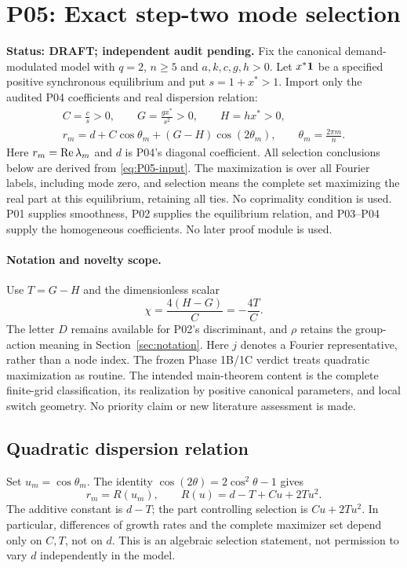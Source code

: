 \section{P05: Exact step-two mode selection}
\label{sec:P05}
\noindent\textbf{Status: DRAFT; independent audit pending.}
Fix the canonical demand-modulated model with $q=2$, $n\ge5$ and
$a,k,c,g,h>0$. Let $x^*\mathbf{1}$ be a specified positive synchronous
equilibrium and put $s=1+x^*>1$. Import only the audited P04 coefficients
and real dispersion relation:
\begin{equation}
\begin{gathered}
 C=\frac cs>0,\qquad G=\frac{gx^*}{s^2}>0,\qquad H=hx^*>0,\\
 r_m=d+C\cos\theta_m+(G-H)\cos(2\theta_m),\qquad
 \theta_m=\frac{2\pi m}{n}.
\end{gathered}
 \label{eq:P05-input}
\end{equation}
Here $r_m=\operatorname{Re}\lambda_m$ and $d$ is P04's diagonal coefficient.
All selection conclusions below are derived from \eqref{eq:P05-input}.
The maximization is over all Fourier labels, including mode zero, and
selection means the complete set maximizing the real part at this
equilibrium, retaining all ties. No coprimality condition is used.
P01 supplies smoothness, P02 supplies the equilibrium relation, and P03--P04
supply the homogeneous coefficients. No later proof module is used.

\paragraph{Notation and novelty scope.}
Use $T=G-H$ and the dimensionless scalar
\begin{equation}
 \chi=\frac{4(H-G)}{C}=-\frac{4T}{C}.
 \label{eq:P05-control}
\end{equation}
The letter $D$ remains available for P02's discriminant, and $\rho$
retains the group-action meaning in Section~\ref{sec:notation}.
Here $j$ denotes a Fourier representative, rather than a node index.
The frozen Phase 1B/1C verdict treats quadratic maximization as routine.
The intended main-theorem content is the complete finite-grid classification,
its realization by positive canonical parameters, and local switch geometry.
No priority claim or new literature assessment is made.

\subsection{Quadratic dispersion relation}
\label{slot:P05-1}
Set $u_m=\cos\theta_m$. The identity $\cos(2\theta)=2\cos^2\theta-1$
gives
\begin{equation}
 r_m=R(u_m),\qquad
 \boxed{R(u)=d-T+Cu+2Tu^2.}
 \label{eq:P05-quadratic}
\end{equation}
The additive constant is $d-T$; the part controlling selection is
$Cu+2Tu^2$. In particular, differences of growth rates and the complete
maximizer set depend only on $C,T$, not on $d$. This is an algebraic
selection statement, not permission to vary $d$ independently in the model.

